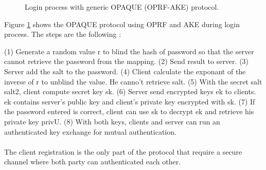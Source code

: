 \documentclass[../report.tex]{subfiles}
\begin{document}
\begin{figure}[h]
 \centering

 \setlength{\fboxsep}{10pt}
 \setlength{\fboxrule}{1pt}

 \caption{Login process with generic OPAQUE (OPRF-AKE) protocol.}
 \label{fig:OPAQUE_AKE}
\end{figure}

Figure \ref{fig:OPAQUE_AKE} shows the OPAQUE protocol using OPRF and AKE during login process.
The steps are the following :

(1) Generate a random value r to blind the hash of password so that the server cannot retrieve the password from the mapping.
(2) Send result to server.
(3) Server add the salt to the password.
(4) Client calculate the exponant of the inverse of r to unblind the value. He canno't retrieve salt.
(5) With the secret salt salt2, client compute secret key sk.
(6) Server send encrypted keys ek to clients. ek contains server's public key and client's private key encrypted with sk.
(7) If the password entered is correct, client can use sk to decrypt ek and retrieve his private key privU.
(8) With both keys, clients and server can run an authenticated key exchange for mutual authentication.


\paragraph{} \label{sec:opaque_register}
The client registration is the only part of the protocol that require a secure channel where both party can authenticated each other.
\end{document}
